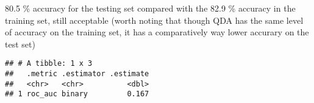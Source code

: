 \documentclass[]{article}
\newenvironment{Shaded}{\begin{snugshade}}{\end{snugshade}}
\newcommand{\DataTypeTok}[1]{\textcolor[rgb]{0.13,0.29,0.53}{#1}}
\newcommand{\KeywordTok}[1]{\textcolor[rgb]{0.13,0.29,0.53}{\textbf{#1}}}
\newcommand{\NormalTok}[1]{#1}
\newcommand{\OperatorTok}[1]{\textcolor[rgb]{0.81,0.36,0.00}{\textbf{#1}}}
\newcommand{\StringTok}[1]{\textcolor[rgb]{0.31,0.60,0.02}{#1}}
\begin{document}
80.5 \% accuracy for the testing set compared with the 82.9 \% accuracy
in the training set, still acceptable (worth noting that though QDA has
the same level of accuracy on the training set, it has a comparatively
way lower accurary on the test set)

\begin{Shaded}
\end{Shaded}

\begin{verbatim}
## # A tibble: 1 x 3
##   .metric .estimator .estimate
##   <chr>   <chr>          <dbl>
## 1 roc_auc binary         0.167
\end{verbatim}
\end{document}
